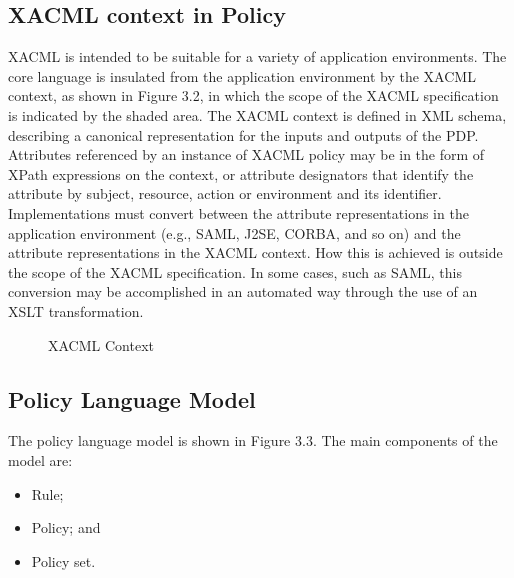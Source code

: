 \subsection{XACML context in Policy}
\hspace{5mm}XACML is intended to be suitable for a variety of application environments. The core language is insulated from the application environment by the XACML context, as shown in Figure 3.2, in which
the scope of the XACML specification is indicated by the shaded area. The XACML context is
defined in XML schema, describing a canonical representation for the inputs and outputs of the
PDP. Attributes referenced by an instance of XACML policy may be in the form of XPath
expressions on the context, or attribute designators that identify the attribute by subject,
resource, action or environment and its identifier. Implementations must convert between the
attribute representations in the application environment (e.g., SAML, J2SE, CORBA, and so on)
and the attribute representations in the XACML context. How this is achieved is outside the
scope of the XACML specification. In some cases, such as SAML, this conversion may be accomplished in an automated way through the use of an XSLT transformation.
\begin{figure}[h!]
\begin{center}
\end{center}
\caption {XACML Context}
\label{vmb2}
\vspace{0mm}
\end{figure}

\subsection{Policy Language Model}
\hspace{5mm}The policy language model is shown in Figure 3.3. The main components of the model are:
\begin{itemize}
\item Rule;
\item Policy; and
\item Policy set.
\end{itemize}

